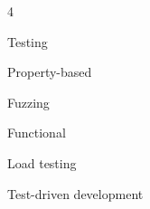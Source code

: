 \documentclass{CurriculumVitae}[10pt, condensed]
\begin{document}
\begin{multicols}{4}
    \begin{skills}{Testing}
    \item {\footnotesize Property-based}
    \item {\footnotesize Fuzzing}
    \item {\footnotesize Functional}
    \item {\footnotesize Load testing}
    \item {\footnotesize Test-driven development}
    \end{skills}
  \end{multicols}
\vfill




\vfill
\end{document}
